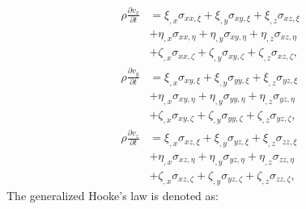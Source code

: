\begin{align}
	\rho \frac{\partial v_{x}}{\partial t} & = \xi_{, x} \sigma_{xx,\xi} + \xi_{, y} \sigma_{xy,\xi} + \xi_{, z} \sigma_{xz,\xi} \\
	& + \eta_{, x} \sigma_{xx,\eta} + \eta_{, y} \sigma_{xy,\eta} + \eta_{, z} \sigma_{xz,\eta}\\
	& + \zeta_{, x} \sigma_{xx,\zeta} + \zeta_{, y} \sigma_{xy,\zeta} + \zeta_{, z} \sigma_{xz,\zeta},\\
	\rho \frac{\partial v_{y}}{\partial t} & = \xi_{, x} \sigma_{xy,\xi} + \xi_{, y} \sigma_{yy,\xi} + \xi_{, z} \sigma_{yz,\xi} \\
	& + \eta_{, x} \sigma_{xy,\eta} + \eta_{, y} \sigma_{yy,\eta} + \eta_{, z} \sigma_{yz,\eta}\\
	& + \zeta_{, x} \sigma_{xy,\zeta} + \zeta_{, y} \sigma_{yy,\zeta} + \zeta_{, z} \sigma_{yz,\zeta},\\
	\rho \frac{\partial v_{z}}{\partial t} & = \xi_{, x} \sigma_{xz,\xi} + \xi_{, y} \sigma_{yz,\xi} + \xi_{, z} \sigma_{zz,\xi} \\
	& + \eta_{, x} \sigma_{xz,\eta} + \eta_{, y} \sigma_{yz,\eta} + \eta_{, z} \sigma_{zz,\eta}\\
	& + \zeta_{, x} \sigma_{xz,\zeta} + \zeta_{, y} \sigma_{yz,\zeta} + \zeta_{, z} \sigma_{zz,\zeta},	
\end{align}
The generalized Hooke's law is denoted as:
